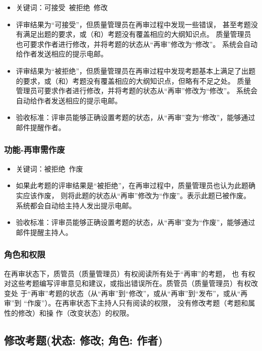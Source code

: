 \documentclass[hyperref, a4paper]{ctexart}
\providecommand{\tightlist}{%
  \setlength{\itemsep}{0pt}\setlength{\parskip}{0pt}}
\begin{document}
\begin{itemize}
\tightlist
\item
  关键词：可接受~被拒绝~修改
\item
  评审结果为``可接受''，但质量管理员在再审过程中发现一些错误，
  甚至考题没有满足出题的要求，或（和）考题没有覆盖相应的大纲知识点。
  质量管理员也可要求作者进行修改，并将考题的状态从``再审''修改为``修改''。
  系统会自动给作者发送相应的提示电邮。
\item
  评审结果为``被拒绝''，但质量管理员在再审过程中发现考题基本上满足了出题的要求，或（和）考题没有覆盖相应的大纲知识点，但略有不足之处。
  质量管理员可要求作者进行修改，并将考题的状态从``再审''修改为``修改''。
  系统会自动给作者发送相应的提示电邮。
\item
  验收标准：评审员能够正确设置考题的状态，从``再审''变为``修改''，能够通过邮件提醒作者。
\end{itemize}

\hypertarget{ux529fux80fd-ux518dux5ba1ux9700ux4f5cux5e9f}{%
\subsubsection{功能-再审需作废}\label{ux529fux80fd-ux518dux5ba1ux9700ux4f5cux5e9f}}

\begin{itemize}
\tightlist
\item
  关键词：被拒绝~作废
\item
  如果此考题的评审结果是``被拒绝''，在再审过程中，质量管理员也认为此题确实应该作废，
  则将此题的状态从``再审''修改为``作废''。表示此题已被作废。
  系统都会自动给主持人发出提示电邮。
\item
  验收标准：评审员能够正确设置考题的状态，从``再审''变为``作废''，能够通过邮件提醒主持人。
\end{itemize}

\hypertarget{ux89d2ux8272ux548cux6743ux9650-1}{%
\subsubsection{角色和权限}\label{ux89d2ux8272ux548cux6743ux9650-1}}

在再审状态下，质管员（质量管理员）有权阅读所有处于``再审''的考题， 也
有权对这些考题编写评审意见和建议，或指出错误所在。质管员（质量管理员）有权改变处
于``再审''考题的状态（从``再审''到``修改''，或从``再审''到``发布''，或从``再审''到
``作废''）。在再审状态下主持人只有阅读的权限，
没有修改考题（考题和属性的修改）和操 作（改变状态）的权限。

\hypertarget{ux4feeux6539ux8003ux9898ux72b6ux6001-ux4feeux6539-ux89d2ux8272-ux4f5cux8005}{%
\subsection{修改考题(状态: 修改; 角色:
作者)}\label{ux4feeux6539ux8003ux9898ux72b6ux6001-ux4feeux6539-ux89d2ux8272-ux4f5cux8005}}
\end{document}

